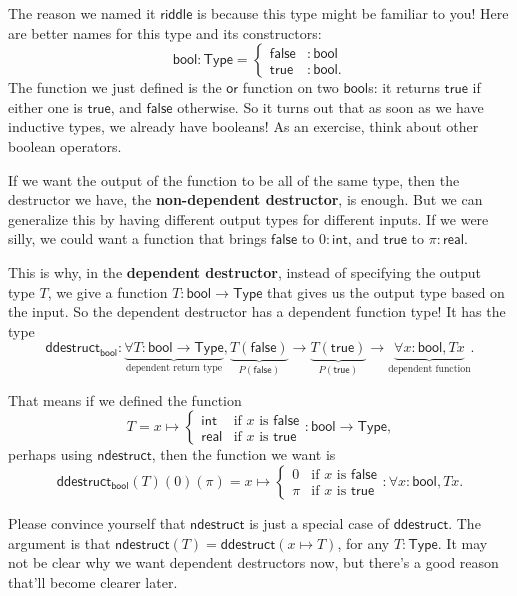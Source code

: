 \documentclass[11pt,paper=letter]{scrartcl}
\newcommand{\sf}{\mathsf}
\newcommand{\type}{\mathsf{Type}}
\begin{document}
The reason we named it $\sf{riddle}$ is because this type might be familiar to you! Here are better names for this type and its constructors: \[
  \sf{bool} : \type = \begin{cases}
    \sf{false}&: \sf{bool} \\
    \sf{true}&: \sf{bool}.
  \end{cases}
\]
The function we just defined is the $\sf{or}$ function on two $\sf{bool}$s: it returns $\sf{true}$ if either one is $\sf{true}$, and $\sf{false}$ otherwise. So it turns out that as soon as we have inductive types, we already have booleans! As an exercise, think about other boolean operators.

If we want the output of the function to be all of the same type, then the destructor we have, the \textbf{non-dependent destructor}, is enough. But we can generalize this by having different output types for different inputs. If we were silly, we could want a function that brings $\sf{false}$ to $0 : \sf{int}$, and $\sf{true}$ to $\pi : \sf{real}$.

This is why, in the \textbf{dependent destructor}, instead of specifying the output type $T$, we give a function $T: \sf{bool} \to \type$ that gives us the output type based on the input. So the dependent destructor has a dependent function type! It has the type \[
  \sf{ddestruct}_\sf{bool}:
  \underbrace{\forall T: \sf{bool} \to \type}_{\text{dependent return type}},
  \underbrace{T(\sf{false})}_{P(\sf{false})} \to
  \underbrace{T(\sf{true})}_{P(\sf{true})} \to
  \underbrace{\forall x: \sf{bool}, Tx}_{\text{dependent function}}.
\]

That means if we defined the function \[
  T = x \mapsto \begin{cases}
    \sf{int} & \text{if $x$ is }\sf{false}\\
    \sf{real} & \text{if $x$ is }\sf{true}
  \end{cases} : \sf{bool} \to \type,
\]
perhaps using $\sf{ndestruct}$, then the function we want is \[
  \sf{ddestruct}_\sf{bool}(T)(0)(\pi) = x \mapsto \begin{cases}
    0 & \text{if $x$ is }\sf{false}\\
    \pi & \text{if $x$ is }\sf{true}
  \end{cases} : \forall x: \sf{bool}, Tx.
\]

Please convince yourself that $\sf{ndestruct}$ is just a special case of $\sf{ddestruct}$. The argument is that $\sf{ndestruct}(T) = \sf{ddestruct}(x \mapsto T)$, for any $T : \type$. It may not be clear why we want dependent destructors now, but there's a good reason that'll become clearer later.
\end{document}

